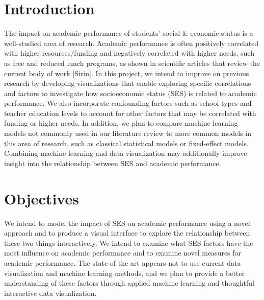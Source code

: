 \documentclass[sigconf,nonacm,11pt]{acmart}
\begin{document}
\clearpage

\section{Introduction}

The impact on academic performance of students' social \& economic status is a well-studied area of research.  Academic performance is often positively correlated with higher resources/funding and negatively correlated with higher needs, such as free and reduced lunch programs, as shown in scientific articles that review the current body of work [Sirin].  In this project, we intend to improve on previous research by developing visualizations that enable exploring specific correlations and factors to investigate how socioeconomic status (SES) is related to academic performance. We also incorporate confounding factors such as school types and teacher education levels to account for other factors that may be correlated with funding or higher needs. In addition, we plan to compare machine learning models not commonly used in our literature review to more common models in this area of research, such as classical statistical models or fixed-effect models. Combining machine learning and data visualization may additionally improve insight into the relationship between SES and academic performance.


\section{Objectives}
We intend to model the impact of SES on academic performance using a novel approach and to produce a visual interface to explore the relationship between these two things interactively.  We intend to examine what SES factors have the most influence on academic performance and to examine novel measures for academic performance.  The state of the art appears not to use current data visualization and machine learning methods, and we plan to provide a better understanding of these factors through applied machine learning and thoughtful interactive data visualization. 
\end{document}
